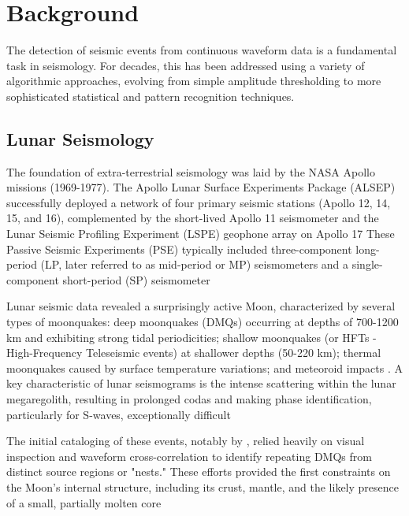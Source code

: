 \documentclass[conference]{IEEEtran}
\begin{document}
\section{Background}
    The detection of seismic events from continuous waveform data is a fundamental task in seismology. For decades, this
    has been addressed using a variety of algorithmic approaches, evolving from simple amplitude thresholding to more
    sophisticated statistical and pattern recognition techniques.
    \subsection{Lunar Seismology}
        The foundation of extra-terrestrial seismology was laid by the NASA Apollo missions (1969-1977). The Apollo
        Lunar Surface Experiments Package (ALSEP) successfully deployed a network of four primary seismic stations
        (Apollo 12, 14, 15, and 16), complemented by the short-lived Apollo 11 seismometer and the Lunar Seismic
        Profiling Experiment (LSPE) geophone array on Apollo 17 \cite{Nakamura1982, Lognonne2005, Nunn2020}
        These Passive Seismic Experiments (PSE) typically included three-component long-period (LP, later referred to as
        mid-period or MP) seismometers and a single-component short-period (SP) seismometer
        \cite{Nunn2020}%

        Lunar seismic data revealed a surprisingly active Moon, characterized by several types of moonquakes: deep
        moonquakes (DMQs) occurring at depths of 700-1200 km and exhibiting strong tidal periodicities; shallow
        moonquakes (or HFTs - High-Frequency Teleseismic events) at shallower depths (50-220 km); thermal moonquakes
        caused by surface temperature variations; and meteoroid impacts \cite{Nakamura1982, Lognonne2005}
        . A key characteristic of lunar seismograms is the intense scattering within the lunar megaregolith, resulting
        in prolonged codas and making phase identification, particularly for S-waves, exceptionally difficult
        \cite{Dainty1981, Garcia2019}

        The initial cataloging of these events, notably by \cite{Nakamura1982}, relied heavily on visual inspection and
        waveform cross-correlation to identify repeating DMQs from distinct source regions or "nests." These efforts
        provided the first constraints on the Moon's internal structure, including its crust, mantle, and the likely
        presence of a small, partially molten core \cite{Weber2011,Garcia2019}
\end{document}
